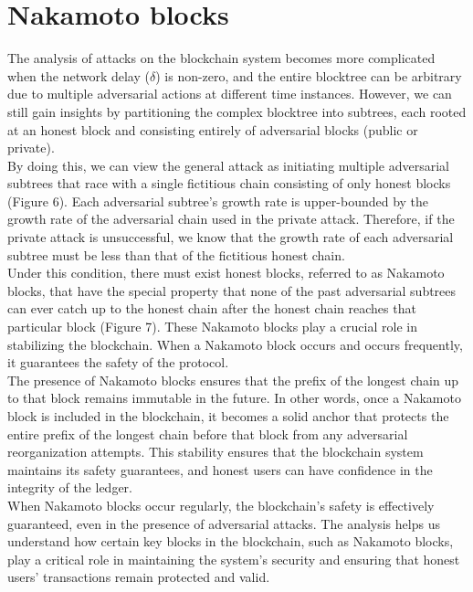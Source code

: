 \documentclass{report}
\begin{document}
\section{Nakamoto blocks}
The analysis of attacks on the blockchain system becomes more complicated when the network delay ($\delta$) is non-zero, and the entire blocktree can be arbitrary due to multiple adversarial actions at different time instances. However, we can still gain insights by partitioning the complex blocktree into subtrees, each rooted at an honest block and consisting entirely of adversarial blocks (public or private).\\
By doing this, we can view the general attack as initiating multiple adversarial subtrees that race with a single fictitious chain consisting of only honest blocks (Figure 6). Each adversarial subtree's growth rate is upper-bounded by the growth rate of the adversarial chain used in the private attack. Therefore, if the private attack is unsuccessful, we know that the growth rate of each adversarial subtree must be less than that of the fictitious honest chain.\\
Under this condition, there must exist honest blocks, referred to as Nakamoto blocks, that have the special property that none of the past adversarial subtrees can ever catch up to the honest chain after the honest chain reaches that particular block (Figure 7). These Nakamoto blocks play a crucial role in stabilizing the blockchain. When a Nakamoto block occurs and occurs frequently, it guarantees the safety of the protocol.\\
The presence of Nakamoto blocks ensures that the prefix of the longest chain up to that block remains immutable in the future. In other words, once a Nakamoto block is included in the blockchain, it becomes a solid anchor that protects the entire prefix of the longest chain before that block from any adversarial reorganization attempts. This stability ensures that the blockchain system maintains its safety guarantees, and honest users can have confidence in the integrity of the ledger.\\
When Nakamoto blocks occur regularly, the blockchain's safety is effectively guaranteed, even in the presence of adversarial attacks. The analysis helps us understand how certain key blocks in the blockchain, such as Nakamoto blocks, play a critical role in maintaining the system's security and ensuring that honest users' transactions remain protected and valid.
\end{document}
